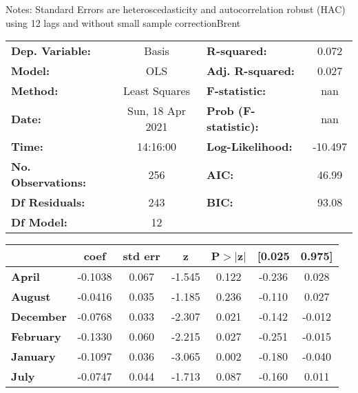 Notes: \newline
 [1] Standard Errors are heteroscedasticity and autocorrelation robust (HAC) using 12 lags and without small sample correctionBrent\begin{center}
\begin{tabular}{lclc}
\toprule
\textbf{Dep. Variable:}    &      Basis       & \textbf{  R-squared:         } &     0.072   \\
\textbf{Model:}            &       OLS        & \textbf{  Adj. R-squared:    } &     0.027   \\
\textbf{Method:}           &  Least Squares   & \textbf{  F-statistic:       } &       nan   \\
\textbf{Date:}             & Sun, 18 Apr 2021 & \textbf{  Prob (F-statistic):} &      nan    \\
\textbf{Time:}             &     14:16:00     & \textbf{  Log-Likelihood:    } &   -10.497   \\
\textbf{No. Observations:} &         256      & \textbf{  AIC:               } &     46.99   \\
\textbf{Df Residuals:}     &         243      & \textbf{  BIC:               } &     93.08   \\
\textbf{Df Model:}         &          12      & \textbf{                     } &             \\
\bottomrule
\end{tabular}
\begin{tabular}{lcccccc}
                   & \textbf{coef} & \textbf{std err} & \textbf{z} & \textbf{P$> |$z$|$} & \textbf{[0.025} & \textbf{0.975]}  \\
\midrule
\textbf{April}     &      -0.1038  &        0.067     &    -1.545  &         0.122        &       -0.236    &        0.028     \\
\textbf{August}    &      -0.0416  &        0.035     &    -1.185  &         0.236        &       -0.110    &        0.027     \\
\textbf{December}  &      -0.0768  &        0.033     &    -2.307  &         0.021        &       -0.142    &       -0.012     \\
\textbf{February}  &      -0.1330  &        0.060     &    -2.215  &         0.027        &       -0.251    &       -0.015     \\
\textbf{January}   &      -0.1097  &        0.036     &    -3.065  &         0.002        &       -0.180    &       -0.040     \\
\textbf{July}      &      -0.0747  &        0.044     &    -1.713  &         0.087        &       -0.160    &        0.011     \\

\end{tabular}
\end{center}
